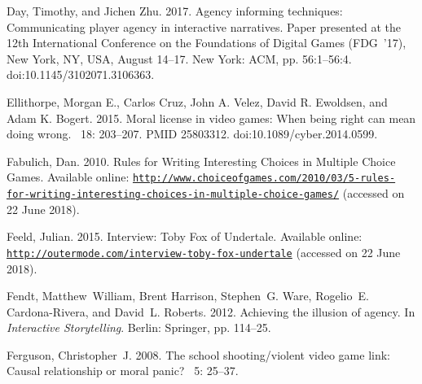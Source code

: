 \documentclass[arts,article,accept,moreauthors,pdftex,10pt,a4paper]{Definitions/mdpi}
\begin{document}
\begin{thebibliography}{999}
Day, Timothy, and Jichen Zhu. 2017.
\newblock Agency informing techniques: {Communicating} player agency in
  interactive narratives.
\newblock Paper presented at the 12th International Conference on the
  Foundations of Digital Games (FDG~'17), New York, NY, USA, August 14--17. New York: ACM, pp. 56:1--56:4.
  \newblock
  doi:10.1145/3102071.3106363.

Ellithorpe, Morgan E., Carlos Cruz, John A. Velez, David R. Ewoldsen, and Adam K. Bogert. 2015.
\newblock Moral license in video games: {When} being right can mean doing
  wrong.
~{18\/}: 203--207.
\newblock PMID 25803312.
  doi:10.1089/cyber.2014.0599.

Fabulich, Dan. 2010.
 Rules for Writing Interesting Choices in Multiple Choice Games.
\newblock Available online:
  \href{http://www.choiceofgames.com/2010/03/5-rules-for-writing-interesting-choices-in-multiple-choice-games/}{\nolinkurl{http://www.choiceofgames.com/2010/03/5-rules-for-writing-interesting-choices-in-multiple-choice-games/}}
  (accessed on 22 June 2018).

Feeld, Julian. 2015. %
\newblock Interview: Toby Fox of Undertale.
\newblock Available online:
  \href{http://outermode.com/interview-toby-fox-undertale}{\nolinkurl{http://outermode.com/interview-toby-fox-undertale}}
  (accessed on 22 June 2018).

Fendt, Matthew~William, Brent Harrison, Stephen~G. Ware, Rogelio~E.
  Cardona-Rivera, and David~L. Roberts. 2012.
\newblock Achieving the illusion of agency.
\newblock In {\em Interactive Storytelling}. Berlin: Springer, pp. 114--25. 

Ferguson, Christopher~J. 2008.
\newblock The school shooting/violent video game link: {Causal} relationship or
  moral panic?
~{5\/}: 25--37.


\end{thebibliography}
\end{document}
